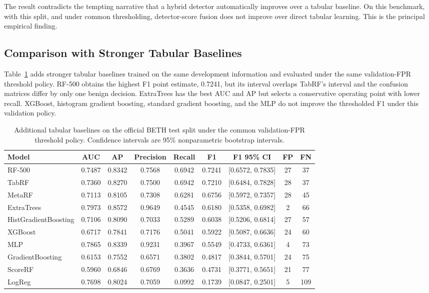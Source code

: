 \documentclass[10pt,journal,compsoc]{IEEEtran}
\begin{document}
The result contradicts the tempting narrative that a hybrid detector automatically improves over a tabular baseline. On this benchmark, with this split, and under common thresholding, detector-score fusion does not improve over direct tabular learning. This is the principal empirical finding.

\subsection{Comparison with Stronger Tabular Baselines}

Table~\ref{tab:sota_tabular} adds stronger tabular baselines trained on the same development information and evaluated under the same validation-FPR threshold policy. RF-500 obtains the highest F1 point estimate, 0.7241, but its interval overlaps TabRF's interval and the confusion matrices differ by only one benign decision. ExtraTrees has the best AUC and AP but selects a conservative operating point with lower recall. XGBoost, histogram gradient boosting, standard gradient boosting, and the MLP do not improve the thresholded F1 under this validation policy.

\begin{table}[t]
\centering
\caption{Additional tabular baselines on the official BETH test split under the common validation-FPR threshold policy. Confidence intervals are 95\% nonparametric bootstrap intervals.}
\label{tab:sota_tabular}
\begin{tabular}{lcccccccc}
\toprule
\textbf{Model} & \textbf{AUC} & \textbf{AP} & \textbf{Precision} & \textbf{Recall} & \textbf{F1} & \textbf{F1 95\% CI} & \textbf{FP} & \textbf{FN} \\
\midrule
RF-500 & 0.7487 & 0.8342 & 0.7568 & 0.6942 & 0.7241 & [0.6572, 0.7835] & 27 & 37 \\
TabRF & 0.7360 & 0.8270 & 0.7500 & 0.6942 & 0.7210 & [0.6484, 0.7828] & 28 & 37 \\
MetaRF & 0.7113 & 0.8105 & 0.7308 & 0.6281 & 0.6756 & [0.5972, 0.7357] & 28 & 45 \\
ExtraTrees & 0.7973 & 0.8572 & 0.9649 & 0.4545 & 0.6180 & [0.5358, 0.6982] & 2 & 66 \\
HistGradientBoosting & 0.7106 & 0.8090 & 0.7033 & 0.5289 & 0.6038 & [0.5206, 0.6814] & 27 & 57 \\
XGBoost & 0.6717 & 0.7841 & 0.7176 & 0.5041 & 0.5922 & [0.5087, 0.6636] & 24 & 60 \\
MLP & 0.7865 & 0.8339 & 0.9231 & 0.3967 & 0.5549 & [0.4733, 0.6361] & 4 & 73 \\
GradientBoosting & 0.6153 & 0.7552 & 0.6571 & 0.3802 & 0.4817 & [0.3844, 0.5701] & 24 & 75 \\
ScoreRF & 0.5960 & 0.6846 & 0.6769 & 0.3636 & 0.4731 & [0.3771, 0.5651] & 21 & 77 \\
LogReg & 0.7698 & 0.8024 & 0.7059 & 0.0992 & 0.1739 & [0.0847, 0.2501] & 5 & 109 \\
\bottomrule
\end{tabular}
\end{table}
\end{document}
